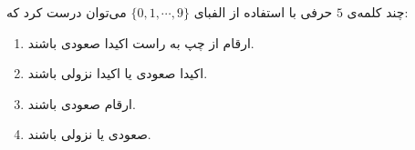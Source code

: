 \EXERCISE
چند کلمه‌ی
$5$
حرفی با استفاده از الفبای
$\{0, 1, \cdots, 9\}$
می‌توان درست کرد که:
\begin{enumerate}
\item
ارقام از چپ به راست اکیدا صعودی باشند.
\item
اکیدا صعودی یا اکیدا نزولی باشند.
\item
ارقام صعودی باشند.
\item
صعودی یا نزولی باشند.
\end{enumerate}